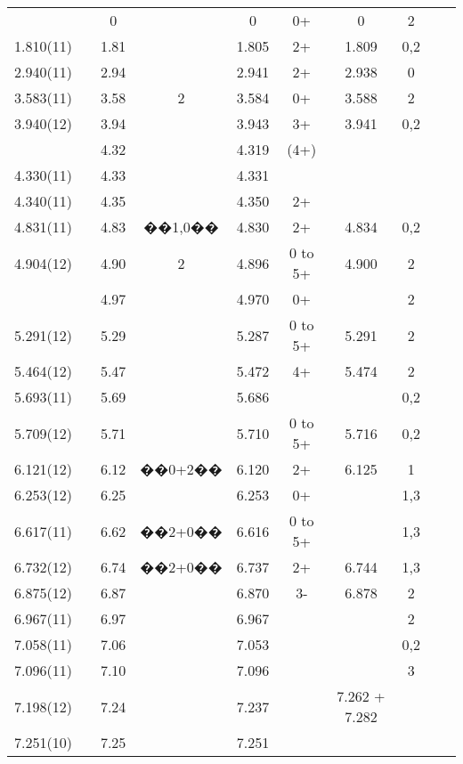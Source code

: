 \begin{landscape}
\begin{center}
\begin{longtable}{cc cc cc cc cc}
\endlastfoot


  &   & 0 &   & 0 & 0+  & 0 & 2 &   &   \\
1.810(11)   &   & 1.81  &   & 1.805 & 2+  & 1.809 & 0,2 &   &   \\
2.940(11)   &   & 2.94  &   & 2.941 & 2+  & 2.938 & 0 &   &   \\
3.583(11)   &   & 3.58  & 2 & 3.584 & 0+  & 3.588 & 2 &   &   \\
3.940(12)   &   & 3.94  &   & 3.943 & 3+  & 3.941 & 0,2 &   &   \\
  &   & 4.32  &   & 4.319 & (4+)  &   &   &   &   \\
4.330(11)   &   & 4.33  &   & 4.331 &   &   &   &   &   \\
4.340(11)   &   & 4.35  &   & 4.350 & 2+  &   &   &   &   \\
4.831(11)   &   & 4.83  & ��1,0�� & 4.830 & 2+  & 4.834 & 0,2 &   &   \\
4.904(12)   &   & 4.90  & 2 & 4.896 & 0 to 5+ & 4.900 & 2 &   &   \\
  &   & 4.97  &   & 4.970 & 0+  &   & 2 &   &   \\
5.291(12)   &   & 5.29  &   & 5.287 & 0 to 5+ & 5.291 & 2 &   &   \\
5.464(12)   &   & 5.47  &   & 5.472 & 4+  & 5.474 & 2 &   &   \\
5.693(11)   &   & 5.69  &   & 5.686 &   &   & 0,2 &   &   \\
5.709(12)   &   & 5.71  &   & 5.710 & 0 to 5+ & 5.716 & 0,2 &   &   \\
6.121(12)   &   & 6.12  & ��0+2�� & 6.120 & 2+  & 6.125 & 1 &   &   \\
6.253(12)   &   & 6.25  &   & 6.253 & 0+  &   & 1,3 &   &   \\
6.617(11)   &   & 6.62  & ��2+0�� & 6.616 & 0 to 5+ &   & 1,3 &   &   \\
6.732(12)   &   & 6.74  & ��2+0�� & 6.737 & 2+  & 6.744 & 1,3 &   &   \\
6.875(12)   &   & 6.87  &   & 6.870 & 3-  & 6.878 & 2 &   &   \\
6.967(11)   &   & 6.97  &   & 6.967 &   &   & 2 &   &   \\
7.058(11)   &   & 7.06  &   & 7.053 &   &   & 0,2 &   &   \\
7.096(11)   &   & 7.10  &   & 7.096 &   &   & 3 &   &   \\
7.198(12)   &   & 7.24  &   & 7.237 &   & 7.262 + 7.282 &   &   &   \\
7.251(10)   &   & 7.25  &   & 7.251 &   &   &   &   &   \\

\end{longtable}
\end{center}
\end{landscape}
